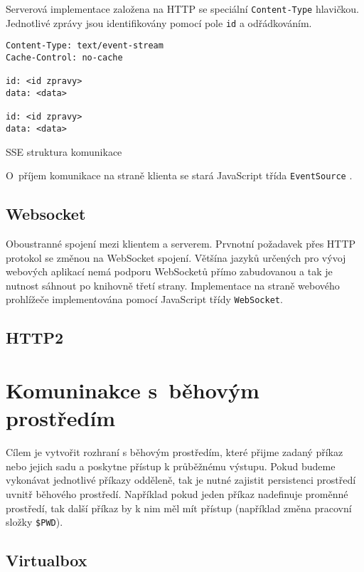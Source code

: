 \noindent
Serverová implementace založena na HTTP se speciální \verb|Content-Type| hlavičkou.
Jednotlivé zprávy jsou identifikovány pomocí pole \verb|id| a odřádkováním.
\cite{sse}

\begin{listing}[ht]
\begin{verbatim}
Content-Type: text/event-stream
Cache-Control: no-cache

id: <id zpravy>
data: <data>

id: <id zpravy>
data: <data>
\end{verbatim}
\caption{SSE struktura komunikace}
\end{listing}

O~příjem komunikace na straně klienta se stará JavaScript třída \verb|EventSource| \cite{sse_event_source}.

\subsection{Websocket}

Oboustranné spojení mezi klientem a serverem.
Prvnotní požadavek přes HTTP protokol se změnou na WebSocket spojení.
Většína jazyků určených pro vývoj webových aplikací nemá podporu WebSocketů přímo zabudovanou a tak je nutnost sáhnout po knihovně třetí strany.
Implementace na straně webového prohlížeče implementována pomocí JavaScript třídy \verb|WebSocket|.
\cite{websocket}

\subsection{HTTP2}


\section{Komuninakce s~běhovým prostředím}

Cílem je vytvořit rozhraní s běhovým prostředím, které přijme zadaný příkaz nebo jejich sadu a poskytne přístup k průběžnému výstupu.
Pokud budeme vykonávat jednotlivé příkazy odděleně, tak je nutné zajistit persistenci prostředí uvnitř běhového prostředí.
Například pokud jeden příkaz nadefinuje proměnné prostředí, tak další příkaz by k nim měl mít přístup (například změna pracovní složky \verb|$PWD|).

\subsection{Virtualbox}

